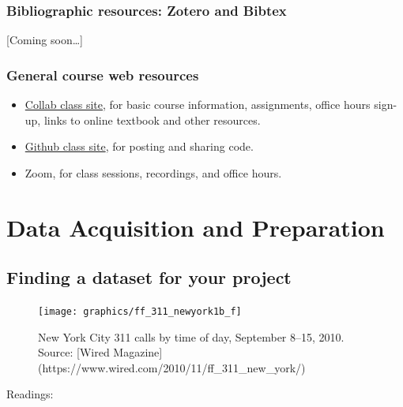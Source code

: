 \documentclass[
]{book}
\providecommand{\tightlist}{%
  \setlength{\itemsep}{0pt}\setlength{\parskip}{0pt}}
\begin{document}
\hypertarget{bibliographic-resources-zotero-and-bibtex}{%
\section{Bibliographic resources: Zotero and Bibtex}\label{bibliographic-resources-zotero-and-bibtex}}

{[}Coming soon\ldots{]}

\hypertarget{general-course-web-resources}{%
\section{General course web resources}\label{general-course-web-resources}}

\begin{itemize}
\tightlist
\item
  \href{https://collab.its.virginia.edu}{Collab class site}, for basic course information, assignments, office hours sign-up, links to online textbook and other resources.
\item
  \href{https://github.com/uva-eng-time-series-sp21}{Github class site}, for posting and sharing code.
\item
  Zoom, for class sessions, recordings, and office hours.
\end{itemize}

\hypertarget{part-data-acquisition-and-preparation}{%
\part{Data Acquisition and Preparation}\label{part-data-acquisition-and-preparation}}

\hypertarget{finding-a-dataset-for-your-project}{%
\chapter{Finding a dataset for your project}\label{finding-a-dataset-for-your-project}}

\begin{figure}

{\centering \texttt{[image: graphics/ff\_311\_newyork1b\_f]} 

}

\caption{New York City 311 calls by time of day, September 8--15, 2010. Source: [Wired Magazine](https://www.wired.com/2010/11/ff_311_new_york/)}\label{fig:unnamed-chunk-10}
\end{figure}

Readings:
\end{document}
